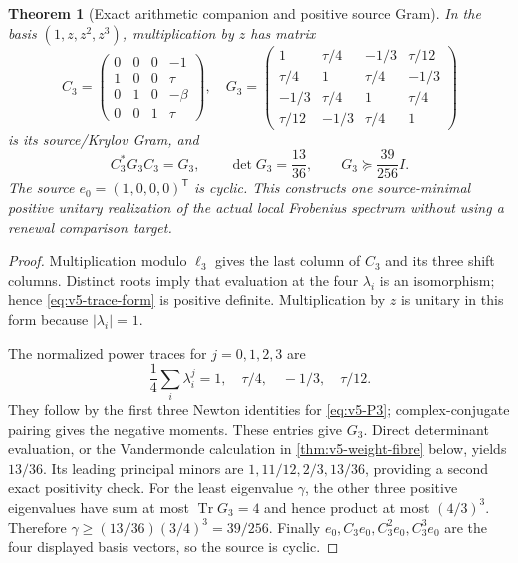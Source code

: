 \documentclass[11pt]{article}
\newtheorem{theorem}{Theorem}[section]
\theoremstyle{definition}
\theoremstyle{remark}
\newcommand{\Tr}{\operatorname{Tr}}
\begin{document}
\begin{theorem}[Exact arithmetic companion and positive source Gram]
\label{thm:v5-tracial-realization}
In the basis $(1,z,z^2,z^3)$, multiplication by $z$ has matrix
\begin{equation}
 C_3=\begin{pmatrix}
 0&0&0&-1\\1&0&0&\tau\\0&1&0&-\beta\\0&0&1&\tau
 \end{pmatrix},
 \quad
 G_3=\begin{pmatrix}
 1&\tau/4&-1/3&\tau/12\\
 \tau/4&1&\tau/4&-1/3\\
 -1/3&\tau/4&1&\tau/4\\
 \tau/12&-1/3&\tau/4&1
 \end{pmatrix}
 \label{eq:v5-companion-Gram}
\end{equation}
is its source/Krylov Gram, and
\begin{equation}
 \boxed{C_3^*G_3C_3=G_3,\qquad
 \det G_3=\frac{13}{36},\qquad
 G_3\succeq\frac{39}{256}I.}
 \label{eq:v5-positive-Gram}
\end{equation}
The source $e_0=(1,0,0,0)^{\mathsf T}$ is cyclic. This constructs one
source-minimal positive unitary realization of the actual local
Frobenius spectrum without using a renewal comparison target.
\end{theorem}
\begin{proof}
Multiplication modulo $\ell_3$ gives the last column of $C_3$ and its
three shift columns. Distinct roots imply that evaluation at the four
$\lambda_i$ is an isomorphism; hence \eqref{eq:v5-trace-form} is positive
definite. Multiplication by $z$ is unitary in this form because
$|\lambda_i|=1$.

The normalized power traces for $j=0,1,2,3$ are
\[
 \frac14\sum_i\lambda_i^j=1,\quad \tau/4,\quad-1/3,\quad\tau/12.
\]
They follow by the first three Newton identities for \eqref{eq:v5-P3};
complex-conjugate pairing gives the negative moments. These entries give
$G_3$. Direct determinant evaluation, or the Vandermonde calculation in
\cref{thm:v5-weight-fibre} below, yields $13/36$. Its leading principal
minors are $1,11/12,2/3,13/36$, providing a second exact positivity check.
For the least eigenvalue $\gamma$, the other three positive eigenvalues
have sum at most $\Tr G_3=4$ and hence product at most $(4/3)^3$.
Therefore
$\gamma\ge(13/36)(3/4)^3=39/256$. Finally
$e_0,C_3e_0,C_3^2e_0,C_3^3e_0$ are the four displayed basis vectors, so
the source is cyclic.
\end{proof}
\end{document}
